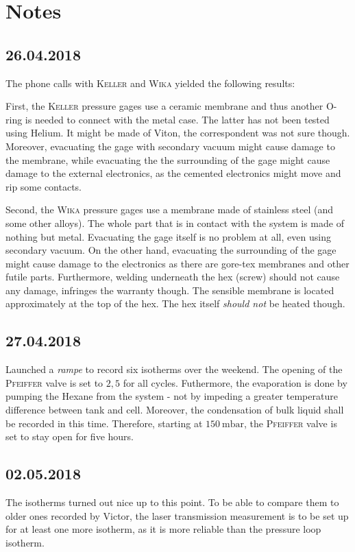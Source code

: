 \documentclass[../thesis.tex]{subfiles}
\begin{document}
    \chapter{Notes}

        \section{26.04.2018}

            The phone calls with \textsc{Keller} and \textsc{Wika} yielded the following results:

            First, the \textsc{Keller} pressure gages use a ceramic membrane and thus another O-ring is needed to connect with the metal case. The latter has not been tested using Helium. It might be made of Viton, the correspondent was not sure though. Moreover, evacuating the gage with secondary vacuum might cause damage to the membrane, while evacuating the the surrounding of the gage might cause damage to the external electronics, as the cemented electronics might move and rip some contacts.

            Second, the \textsc{Wika} pressure gages use a membrane made of stainless steel (and some other alloys). The whole part that is in contact with the system is made of nothing but metal. Evacuating the gage itself is no problem at all, even using secondary vacuum. On the other hand, evacuating the surrounding of the gage might cause damage to the electronics as there are gore-tex membranes and other futile parts. Furthermore, welding underneath the hex (screw) should not cause any damage, infringes the warranty though. The sensible membrane is located approximately at the top of the hex. The hex itself \textit{should not} be heated though.


        \section{27.04.2018}

            Launched a \textit{rampe} to record six isotherms over the weekend. The opening of the \textsc{Pfeiffer} valve is set to $2,5$ for all cycles. Futhermore, the evaporation is done by pumping the Hexane from the system - not by impeding a greater temperature difference between tank and cell. Moreover, the condensation of bulk liquid shall be recorded in this time. Therefore, starting at $\SI{150}{\milli\bar}$, the \textsc{Pfeiffer} valve is set to stay open for five hours.


        \section{02.05.2018}
            The isotherms turned out nice up to this point. To be able to compare them to older ones recorded by Victor, the laser transmission measurement is to be set up for at least one more isotherm, as it is more reliable than the pressure loop isotherm.
\end{document}
